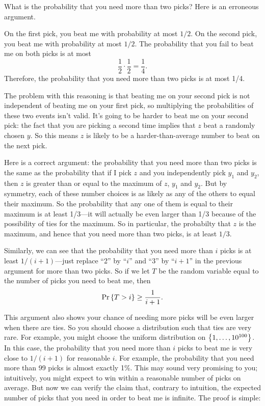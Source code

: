 \documentclass[11pt,twoside]{article}
\begin{document}
What is the probability that you need more than two picks?  Here is an
erroneous argument.
\begin{falseproof}
On the first pick, you beat me with probability at most $1/2$.  On the
second pick, you beat me with probability at most $1/2$.  The probability
that you fail to beat me on both picks is at most
\[
\frac{1}{2} \cdot \frac{1}{2} = \frac{1}{4}.
\]
Therefore, the probability that you need more than two picks is at most
1/4.
\end{falseproof}

The problem with this reasoning is that beating me on your second pick is
not independent of beating me on your first pick, so multiplying the
probabilities of these two events isn't valid.  It's going to be harder to
beat me on your second pick: the fact that you are picking a second time
implies that $z$ beat a randomly chosen $y$.  So this means $z$ is likely
to be a harder-than-average number to beat on the next pick.

Here is a correct argument: the probability that you need more than two
picks is the same as the probability that if I pick $z$ and you
independently pick $y_1$ and $y_2$, then $z$ is greater than or equal to
the maximum of $z$, $y_1$ and $y_2$.  But by symmetry, each of these
number choices is as likely as any of the others to equal their maximum.
So the probability that any one of them is equal to their maximum is at
least 1/3---it will actually be even larger than 1/3 because of the
possibility of ties for the maximum.  So in particular, the probabilty
that $z$ is the maximum, and hence that you need more than two picks, is
at least $1/3$.

Similarly, we can see that the probability that you need more than $i$
picks is at least $1/(i+1)$---just replace ``2'' by ``$i$'' and ``3'' by
``$i+1$'' in the previous argument for more than two picks.  So if we let
$T$ be the random variable equal to the number of picks you need to beat
me, then
\begin{equation}\label{T>i}
\mathop{\textup{Pr}}\nolimits\left\{T > i\right\} \geq \frac{1}{i+1}.
\end{equation}

This argument also shows your chance of needing more picks will be even
larger when there are ties.  So you should choose a distribution such that
ties are very rare.  For example, you might choose the uniform
distribution on $\left\{1,\dots, 10^{100}\right\}$.  In this case, the probability
that you need more than $i$ picks to beat me is very close to $1/(i+1)$
for reasonable $i$.  For example, the probability that you need more than
99 picks is almost exactly 1\%.  This may sound very promising to you;
intuitively, you might expect to win within a reasonable number of picks
on average.  But now we can verify the claim that, contrary to intuition,
the expected number of picks that you need in order to beat me is
infinite.  The proof is simple:
\end{document}
